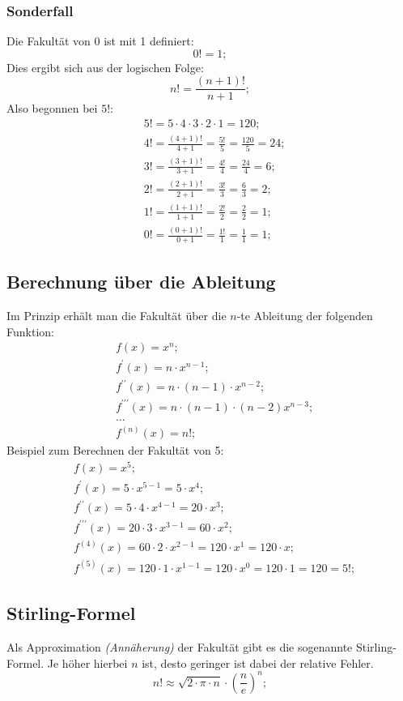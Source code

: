 \documentclass[a4paper]{article}
\begin{document}
\subsubsection{Sonderfall}
Die Fakultät von 0 ist mit 1 definiert:
\[
	0! = 1;
\]
Dies ergibt sich aus der logischen Folge:
\[
	n! = \frac{(n + 1)!}{n + 1} ;
\]
Also begonnen bei $5!$:
\begin{align*}
	& 5! = 5 \cdot 4 \cdot 3 \cdot 2 \cdot 1 = 120 ;
	\\
	& 4! = \frac{(4 + 1)!}{4 + 1} = \frac{5!}{5} = \frac{120}{5} = 24 ;
	\\
	& 3! = \frac{(3 + 1)!}{3 + 1} = \frac{4!}{4} = \frac{24}{4} = 6 ;
	\\
	& 2! = \frac{(2 + 1)!}{2 + 1} = \frac{3!}{3} = \frac{6}{3} = 2 ;
	\\
	& 1! = \frac{(1 + 1)!}{1 + 1} = \frac{2!}{2} = \frac{2}{2} = 1 ;
	\\
	& 0! = \frac{(0 + 1)!}{0 + 1} = \frac{1!}{1} = \frac{1}{1} = 1 ;
\end{align*}

\subsection{Berechnung über die Ableitung}
Im Prinzip erhält man die Fakultät über die $n$-te Ableitung der folgenden Funktion:
\begin{align*}
	& f(x) = x^n ;
	\\
	& f^\prime(x) = n \cdot x^{n - 1} ;
	\\
	& f^{\prime\prime}(x) = n \cdot \left( n - 1 \right) \cdot x^{n - 2} ;
	\\
	& f^{\prime\prime\prime}(x) = n \cdot \left( n - 1 \right) \cdot \left( n - 2 \right)x^{n - 3} ;
	\\
	& ...
	\\
	& f^{(n)}(x) = n! ;
\end{align*}
Beispiel zum Berechnen der Fakultät von 5:
\begin{align*}
	& f(x) = x^5 ;
	\\
	& f^\prime(x) = 5 \cdot x^{5 - 1} = 5 \cdot x^4 ;
	\\
	& f^{\prime\prime}(x) = 5 \cdot 4 \cdot x^{4 - 1} = 20 \cdot x^3 ;
	\\
	& f^{\prime\prime\prime}(x) = 20 \cdot 3 \cdot x^{3 - 1} = 60 \cdot x^2;
	\\
	& f^{(4)}(x) = 60 \cdot 2 \cdot x^{2 - 1} = 120 \cdot x^1 = 120 \cdot x ;
	\\
	& f^{(5)}(x) = 120 \cdot 1 \cdot x^{1 - 1} = 120 \cdot x^0 = 120 \cdot 1 = 120 = 5! ;
\end{align*}

\subsection{Stirling-Formel}
Als Approximation \textit{(Annäherung)} der Fakultät gibt es die sogenannte Stirling-Formel. Je höher hierbei $n$ ist, desto geringer ist dabei der relative Fehler.
\[
	n! \approx \sqrt{2 \cdot \pi \cdot n} \cdot \left( \frac{n}{e} \right) ^n ;
\]
\end{document}
